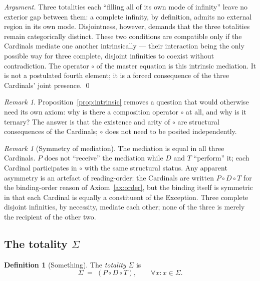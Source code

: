 \documentclass[11pt,a4paper]{article}
\theoremstyle{definition}
\newtheorem{definition}[theorem]{Definition}
\theoremstyle{remark}
\newtheorem{remark}[theorem]{Remark}
\begin{document}
\begin{proof}[Argument]
Three totalities each ``filling all of its own mode of infinity'' leave no exterior gap between them: a complete infinity, by definition, admits no external region in its own mode. Disjointness, however, demands that the three totalities remain categorically distinct. These two conditions are compatible only if the Cardinals mediate one another intrinsically --- their interaction being the only possible way for three complete, disjoint infinities to coexist without contradiction. The operator $\circ$ of the master equation is this intrinsic mediation. It is not a postulated fourth element; it is a forced consequence of the three Cardinals' joint presence. \qed
\end{proof}

\begin{remark}
Proposition~\ref{prop:intrinsic} removes a question that would otherwise need its own axiom: why is there a composition operator $\circ$ at all, and why is it ternary? The answer is that the existence and arity of $\circ$ are structural consequences of the Cardinals; $\circ$ does not need to be posited independently.
\end{remark}

\begin{remark}[Symmetry of mediation]\label{rem:mediation-symmetry}
The mediation is equal in all three Cardinals. $P$ does not ``receive'' the mediation while $D$ and $T$ ``perform'' it; each Cardinal participates in $\circ$ with the same structural status. Any apparent asymmetry is an artefact of reading-order: the Cardinals are written $P \circ D \circ T$ for the binding-order reason of Axiom~\ref{ax:order}, but the binding itself is symmetric in that each Cardinal is equally a constituent of the Exception. Three complete disjoint infinities, by necessity, mediate each other; none of the three is merely the recipient of the other two.
\end{remark}

\subsection{The totality $\Sigma$}\label{subsec:Sigma}

\begin{definition}[Something]\label{def:Sigma}
The \emph{totality} $\Sigma$ is
\[
\Sigma \;=\; (P \circ D \circ T), \qquad \forall x: x \in \Sigma.
\]
\end{definition}
\end{document}
